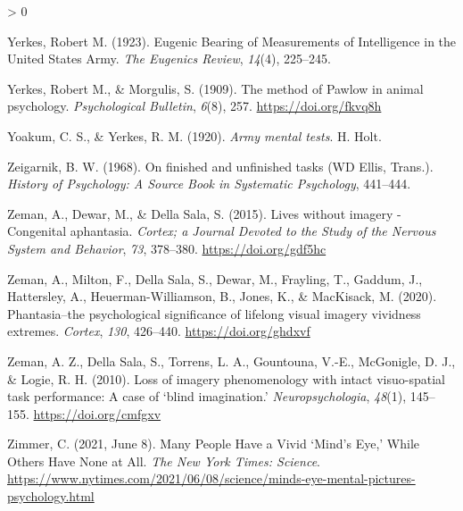\documentclass[
  oneside,
  12pt]{crumpbook}
\newlength{\cslhangindent}
\newenvironment{CSLReferences}[2] %
 {%
  \setlength{\parindent}{0pt}
  \ifodd #1 \everypar{\setlength{\hangindent}{\cslhangindent}}\ignorespaces\fi
  \ifnum #2 > 0
  \setlength{\parskip}{#2\baselineskip}
  \fi
 }%
 {}
\begin{document}
\begin{CSLReferences}{1}{0}
\leavevmode\hypertarget{ref-yerkesEugenicBearingMeasurements1923}{}%
Yerkes, Robert M. (1923). Eugenic {Bearing} of {Measurements} of {Intelligence} in the {United States Army}. \emph{The Eugenics Review}, \emph{14}(4), 225--245.

\leavevmode\hypertarget{ref-yerkesMethodPawlowAnimal1909}{}%
Yerkes, Robert M., \& Morgulis, S. (1909). The method of {Pawlow} in animal psychology. \emph{Psychological Bulletin}, \emph{6}(8), 257. \url{https://doi.org/fkvq8h}

\leavevmode\hypertarget{ref-yoakumArmyMentalTests1920}{}%
Yoakum, C. S., \& Yerkes, R. M. (1920). \emph{Army mental tests}. {H. Holt}.

\leavevmode\hypertarget{ref-zeigarnikFinishedUnfinishedTasks1968}{}%
Zeigarnik, B. W. (1968). On finished and unfinished tasks ({WD Ellis}, {Trans}.). \emph{History of Psychology: A Source Book in Systematic Psychology}, 441--444.

\leavevmode\hypertarget{ref-zemanLivesImageryCongenital2015}{}%
Zeman, A., Dewar, M., \& Della Sala, S. (2015). Lives without imagery - {Congenital} aphantasia. \emph{Cortex; a Journal Devoted to the Study of the Nervous System and Behavior}, \emph{73}, 378--380. \url{https://doi.org/gdf5hc}

\leavevmode\hypertarget{ref-zemanPhantasiaPsychologicalSignificance2020}{}%
Zeman, A., Milton, F., Della Sala, S., Dewar, M., Frayling, T., Gaddum, J., Hattersley, A., Heuerman-Williamson, B., Jones, K., \& MacKisack, M. (2020). Phantasia--the psychological significance of lifelong visual imagery vividness extremes. \emph{Cortex}, \emph{130}, 426--440. \url{https://doi.org/ghdxvf}

\leavevmode\hypertarget{ref-zemanLossImageryPhenomenology2010}{}%
Zeman, A. Z., Della Sala, S., Torrens, L. A., Gountouna, V.-E., McGonigle, D. J., \& Logie, R. H. (2010). Loss of imagery phenomenology with intact visuo-spatial task performance: {A} case of {`blind imagination.'} \emph{Neuropsychologia}, \emph{48}(1), 145--155. \url{https://doi.org/cmfgxv}

\leavevmode\hypertarget{ref-zimmerManyPeopleHave2021}{}%
Zimmer, C. (2021, June 8). Many {People Have} a {Vivid} {`{Mind}'s {Eye},'} {While Others Have None} at {All}. \emph{The New York Times: Science}. \url{https://www.nytimes.com/2021/06/08/science/minds-eye-mental-pictures-psychology.html}

\end{CSLReferences}
\end{document}
